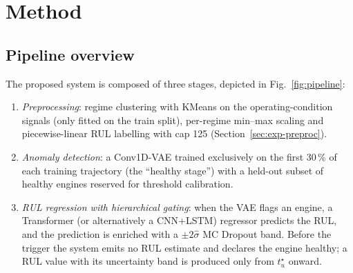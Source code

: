 \documentclass[5p,times,authoryear]{elsarticle}
\begin{document}
\section{Method}\label{sec:method}

\subsection{Pipeline overview}\label{sec:method-pipeline}

The proposed system is composed of three stages, depicted in Fig.~\ref{fig:pipeline}:
\begin{sloppypar}
\begin{enumerate}
    \item \emph{Preprocessing}: regime clustering with KMeans on the operating-condition signals (only fitted on the train split), per-regime min--max scaling and piecewise-linear RUL labelling with cap 125 (Section~\ref{sec:exp-preproc}).
    \item \emph{Anomaly detection}: a Conv1D-VAE trained exclusively on the first 30\,\% of each training trajectory (the ``healthy stage'') with a held-out subset of healthy engines reserved for threshold calibration.
    \item \emph{RUL regression with hierarchical gating}: when the VAE flags an engine, a Transformer (or alternatively a CNN+LSTM) regressor predicts the RUL, and the prediction is enriched with a $\pm 2\hat\sigma$ MC Dropout band. Before the trigger the system emits no RUL estimate and declares the engine healthy; a RUL value with its uncertainty band is produced only from $t^\star_u$ onward.
\end{enumerate}
\end{sloppypar}
\end{document}
